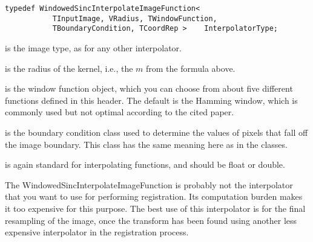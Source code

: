 \small
\begin{verbatim}
typedef WindowedSincInterpolateImageFunction<
           TInputImage, VRadius, TWindowFunction,
           TBoundaryCondition, TCoordRep >    InterpolatorType;

\end{verbatim}
\normalsize

 is the image type, as for any other interpolator.

 is the radius of the kernel, i.e., the $m$ from the
formula above.

 is the window function object, which you can choose from
about five different functions defined in this header. The default is the
Hamming window, which is commonly used but not optimal according to the cited
paper.

 is the boundary condition class used to determine the
values of pixels that fall off the image boundary. This class has the same
meaning here as in the  classes.

 is again standard for interpolating functions, and should be
float or double.


The WindowedSincInterpolateImageFunction is probably not the interpolator that
you want to use for performing registration. Its computation burden makes it
too expensive for this purpose. The best use of this interpolator is for the
final resampling of the image, once the transform has been found using
another less expensive interpolator in the registration process.
